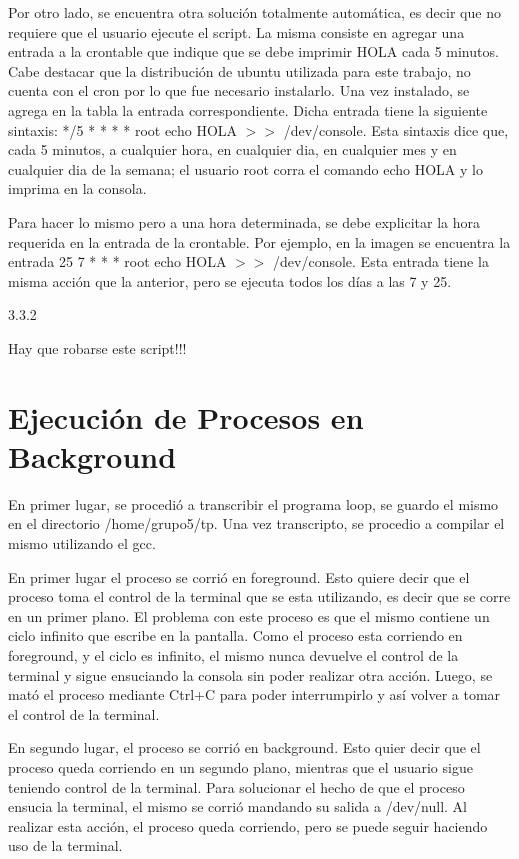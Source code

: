 \documentclass[a4paper, 12pt]{article}
\begin{document}
Por otro lado, se encuentra otra soluci\'on totalmente autom\'atica, es decir que no requiere que el usuario ejecute el script. La misma consiste en agregar una entrada a la crontable que indique que se debe imprimir HOLA cada 5 minutos. Cabe destacar que la distribuci\'on de ubuntu utilizada para este trabajo, no cuenta con el cron por lo que fue necesario instalarlo. Una vez instalado, se agrega en la tabla la entrada correspondiente. Dicha entrada tiene la siguiente sintaxis: */5  * * * * root echo HOLA $>>$ /dev/console. Esta sintaxis dice que, cada 5 minutos, a cualquier hora, en cualquier dia, en cualquier mes y en cualquier dia de la semana; el usuario root corra el comando echo HOLA y lo imprima en la consola.

Para hacer lo mismo pero a una hora determinada, se debe explicitar la hora requerida en la entrada de la crontable. Por ejemplo, en la imagen se encuentra la entrada 25 7 * * * root echo HOLA $>>$ /dev/console. Esta entrada tiene la misma acci\'on que la anterior, pero se ejecuta todos los d\'ias a las 7 y 25. 

\bigskip


3.3.2

Hay que robarse este script!!!

\section*{Ejecuci\'on de Procesos en Background}

En primer lugar, se procedi\'o a transcribir el programa loop, se guardo el mismo en el directorio /home/grupo5/tp. Una vez transcripto, se procedio a compilar el mismo utilizando el gcc. 

\bigskip

En primer lugar el proceso se corri\'o en foreground. Esto quiere decir que el proceso toma el control de la terminal que se esta utilizando, es decir que se corre en un primer plano. El problema con este proceso es que el mismo contiene un ciclo infinito que escribe en la pantalla. Como el proceso esta corriendo en foreground, y el ciclo es infinito, el mismo nunca devuelve el control de la terminal y sigue ensuciando la consola sin poder realizar otra acci\'on. Luego, se mat\'o el proceso mediante Ctrl+C para poder interrumpirlo y as\'i volver a tomar el control de la terminal.

En segundo lugar, el proceso se corri\'o en background. Esto quier decir que el proceso queda corriendo en un segundo plano, mientras que el usuario sigue teniendo control de la terminal. Para solucionar el hecho de que el proceso ensucia la terminal, el mismo se corri\'o mandando su salida a /dev/null. Al realizar esta acci\'on, el proceso queda corriendo, pero se puede seguir haciendo uso de la terminal. 
\end{document}
